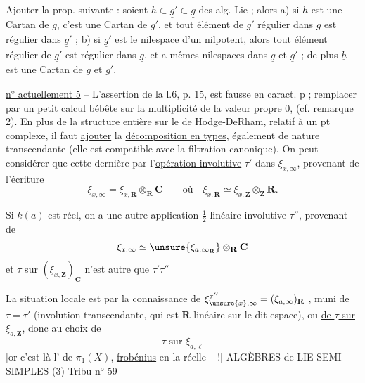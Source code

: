Ajouter la prop. suivante : soient $\underline h\subset\underline g'\subset\underline g$ des alg. Lie ; alors a) si $\underline h$ est une Cartan de $\underline g$, c'est une Cartan de $\underline g'$, et tout élément de $\underline g'$ régulier dans $\underline g$ est régulier dans $\underline g'$ ; b) si $\underline g'$ est le nilespace d'un nilpotent, alors tout élément régulier de $\underline g'$ est régulier dans $\underline g$, et a mêmes nilespaces dans $\underline g$ et $\underline g'$ ; de plus $\underline h$ est une Cartan de $\underline g$ et $\underline g'$.

\uline{n° actuellement 5} -- L'assertion de la l.6, p. 15, est fausse en caract. p ; remplacer par un petit calcul bébête sur la multiplicité de la valeur propre 0, (cf. remarque 2).
En plus de la \uline{structure entière} sur le   de Hodge-DeRham, relatif à un pt complexe, il faut \uline{ajouter} la \uline{décomposition en types}, également de nature transcendante (elle est compatible avec la filtration canonique). On peut considérer que cette dernière   par l'\uline{opération involutive} $\tau'$  dans $\xi_{x,\infty}$, provenant de l'écriture
\[
\xi_{x,\infty}=\xi_{x,\mathbf R}\otimes_{\mathbf R}\mathbf C
\qquad\text{où}\quad\xi_{x,\mathbf R}\simeq\xi_{x,\mathbf Z}\otimes_{\mathbf Z}\mathbf R.
\]

Si $k(a)$ est réel, on a une autre application $\frac12$ linéaire involutive $\tau''$, provenant de
\[
\xi_{x,\infty}\simeq\unsure{\xi_{a,\infty_{\mathbf R}}}\otimes_{\mathbf R}\mathbf C
\]
et $\tau$ sur $(\xi_{x,\mathbf Z})_{\mathbf C}$ n'est autre que $\tau'\tau''$

La situation locale  est  par la connaissance de $\xi_{\unsure{x},\infty}^{\tau''}=(\xi_{a,\infty})_{\mathbf R}$ , muni de $\tau=\tau'$ (involution transcendante, qui est $\mathbf R$-linéaire sur le dit espace), ou  \uline{ de $\tau$ sur $\xi_{a,\mathbf Z}$}, donc au choix de
\[
\boxed{\tau\text{ sur }\xi_{a,\ell}}
\]
[or c'est là  l' de $\pi_1(X)$, \uline{frobénius} en la  réelle -- !]
ALGÈBRES de LIE SEMI-SIMPLES (3) \hfill Tribu n° 59


